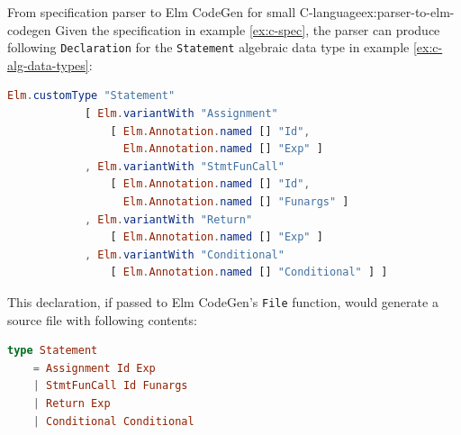 \documentclass{article}
\begin{document}
\begin{example}{From specification parser to Elm CodeGen for small C-language}{ex:parser-to-elm-codegen}
Given the specification in example \ref{ex:c-spec}, the parser can produce following \texttt{Declaration} for the \texttt{Statement} algebraic data type in example \ref{ex:c-alg-data-types}:
\begin{lstlisting}[backgroundcolor=\color{myexamplecolorback},language=elm]
Elm.customType "Statement"
            [ Elm.variantWith "Assignment" 
                [ Elm.Annotation.named [] "Id", 
                  Elm.Annotation.named [] "Exp" ]
            , Elm.variantWith "StmtFunCall" 
                [ Elm.Annotation.named [] "Id", 
                  Elm.Annotation.named [] "Funargs" ]
            , Elm.variantWith "Return" 
                [ Elm.Annotation.named [] "Exp" ]
            , Elm.variantWith "Conditional" 
                [ Elm.Annotation.named [] "Conditional" ] ]
\end{lstlisting}

This declaration, if passed to Elm CodeGen's \texttt{File} function, would generate a source file with following contents:
\begin{lstlisting}[backgroundcolor=\color{myexamplecolorback},language=elm]
type Statement
    = Assignment Id Exp
    | StmtFunCall Id Funargs
    | Return Exp
    | Conditional Conditional
\end{lstlisting}
\end{example}



\end{document}
